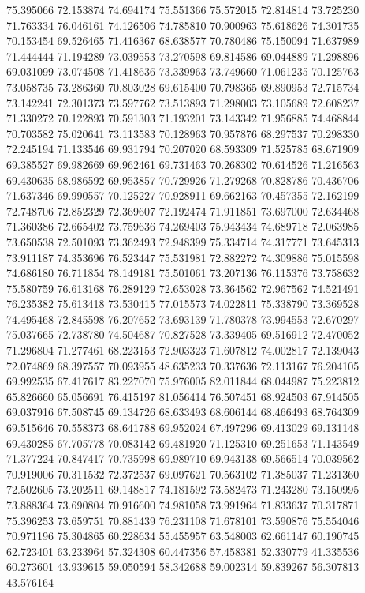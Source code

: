 75.395066
72.153874
74.694174
75.551366
75.572015
72.814814
73.725230
71.763334
76.046161
74.126506
74.785810
70.900963
75.618626
74.301735
70.153454
69.526465
71.416367
68.638577
70.780486
75.150094
71.637989
71.444444
71.194289
73.039553
73.270598
69.814586
69.044889
71.298896
69.031099
73.074508
71.418636
73.339963
73.749660
71.061235
70.125763
73.058735
73.286360
70.803028
69.615400
70.798365
69.890953
72.715734
73.142241
72.301373
73.597762
73.513893
71.298003
73.105689
72.608237
71.330272
70.122893
70.591303
71.193201
73.143342
71.956885
74.468844
70.703582
75.020641
73.113583
70.128963
70.957876
68.297537
70.298330
72.245194
71.133546
69.931794
70.207020
68.593309
71.525785
68.671909
69.385527
69.982669
69.962461
69.731463
70.268302
70.614526
71.216563
69.430635
68.986592
69.953857
70.729926
71.279268
70.828786
70.436706
71.637346
69.990557
70.125227
70.928911
69.662163
70.457355
72.162199
72.748706
72.852329
72.369607
72.192474
71.911851
73.697000
72.634468
71.360386
72.665402
73.759636
74.269403
75.943434
74.689718
72.063985
73.650538
72.501093
73.362493
72.948399
75.334714
74.317771
73.645313
73.911187
74.353696
76.523447
75.531981
72.882272
74.309886
75.015598
74.686180
76.711854
78.149181
75.501061
73.207136
76.115376
73.758632
75.580759
76.613168
76.289129
72.653028
73.364562
72.967562
74.521491
76.235382
75.613418
73.530415
77.015573
74.022811
75.338790
73.369528
74.495468
72.845598
76.207652
73.693139
71.780378
73.994553
72.670297
75.037665
72.738780
74.504687
70.827528
73.339405
69.516912
72.470052
71.296804
71.277461
68.223153
72.903323
71.607812
74.002817
72.139043
72.074869
68.397557
70.093955
48.635233
70.337636
72.113167
76.204105
69.992535
67.417617
83.227070
75.976005
82.011844
68.044987
75.223812
65.826660
65.056691
76.415197
81.056414
76.507451
68.924503
67.914505
69.037916
67.508745
69.134726
68.633493
68.606144
68.466493
68.764309
69.515646
70.558373
68.641788
69.952024
67.497296
69.413029
69.131148
69.430285
67.705778
70.083142
69.481920
71.125310
69.251653
71.143549
71.377224
70.847417
70.735998
69.989710
69.943138
69.566514
70.039562
70.919006
70.311532
72.372537
69.097621
70.563102
71.385037
71.231360
72.502605
73.202511
69.148817
74.181592
73.582473
71.243280
73.150995
73.888364
73.690804
70.916600
74.981058
73.991964
71.833637
70.317871
75.396253
73.659751
70.881439
76.231108
71.678101
73.590876
75.554046
70.971196
75.304865
60.228634
55.455957
63.548003
62.661147
60.190745
62.723401
63.233964
57.324308
60.447356
57.458381
52.330779
41.335536
60.273601
43.939615
59.050594
58.342688
59.002314
59.839267
56.307813
43.576164
